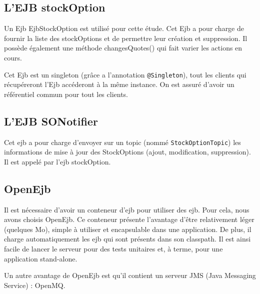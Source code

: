 \subsection{L'EJB stockOption}
Un Ejb EjbStockOption est utilisé pour cette étude. Cet Ejb a pour charge de fournir la liste des stockOptions et de permettre leur création et suppression. Il possède également une méthode changesQuotes() qui fait varier les actions en cours. 

Cet Ejb est un singleton (grâce a l'annotation \verb|@Singleton|), tout les clients qui récupéreront l'Ejb accéderont à la même instance. On est assuré d'avoir un référentiel commun pour tout les clients.

\subsection{L'EJB SONotifier}
Cet ejb a pour charge d'envoyer sur un topic (nommé \verb|StockOptionTopic|) les informations de mise à jour des StockOptions (ajout, modification, suppression). Il est appelé par l'ejb stockOption.

\subsection{OpenEjb}
Il est nécessaire d'avoir un conteneur d'ejb pour utiliser des ejb. Pour cela, nous avons choisis OpenEjb. Ce conteneur présente l'avantage d'être relativement léger (quelques Mo), simple à utiliser et encapsulable dans une application. De plus, il charge automatiquement les ejb qui sont présents dans son classpath. Il est ainsi facile de lancer le serveur pour des tests unitaires et, à terme, pour une application stand-alone. 

Un autre avantage de OpenEjb est qu'il contient un serveur JMS (Java Messaging Service) : OpenMQ.
